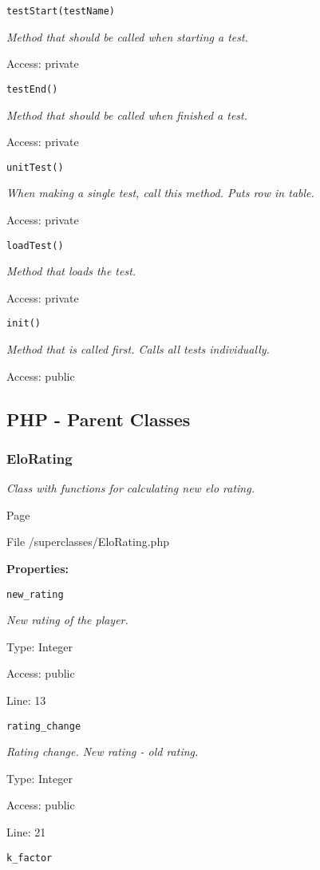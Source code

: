 \texttt{testStart(testName)}

{\scriptsize
\textit{Method that should be called when starting a test.}

Access: private

}

\texttt{testEnd()}

{\scriptsize
\textit{Method that should be called when finished a test.}

Access: private

}

\texttt{unitTest()}

{\scriptsize
\textit{When making a single test, call this method.
Puts row in table.}

Access: private

}

\texttt{loadTest()}

{\scriptsize
\textit{Method that loads the test.}

Access: private

}

\texttt{init()}

{\scriptsize
\textit{Method that is called first.
Calls all tests individually.}

Access: public

}

\subsection{PHP - Parent Classes}
\subsubsection{EloRating}
\textit{Class with functions for calculating new elo rating.}

Page \pageref{EloRating.php}

File /superclasses/EloRating.php

\textbf{Properties:}

\texttt{new\_rating}

{\scriptsize
\textit{New rating of the player.}

Type: Integer

Access: public

Line: 13

}
\texttt{rating\_change}

{\scriptsize
\textit{Rating change.
New rating - old rating.}

Type: Integer

Access: public

Line: 21

}
\texttt{k\_factor}

